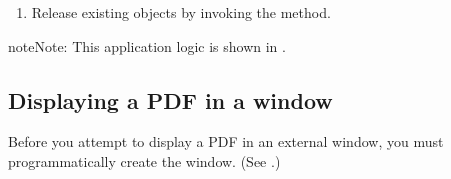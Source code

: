 \documentclass[letterpaper,12pt,english,openany,oneside]{sphinxmanual}
\begin{document}
\begin{sphinxVerbatim}[commandchars=\\\{\}]
    
       
\end{sphinxVerbatim}
\begin{enumerate}
%
\setcounter{enumi}{10}
\item {} 
Release existing  objects by invoking the  method.

\end{enumerate}

\begin{sphinxVerbatim}[commandchars=\\\{\}]
 
  
\end{sphinxVerbatim}

\begin{sphinxadmonition}{note}{Note:}
This application logic is shown in .
\end{sphinxadmonition}


\subsection{Displaying a PDF in a window}
\label{\detokenize{Plugins_Documents:displaying-a-pdf-in-a-window}}
Before you attempt to display a PDF in an external window, you must programmatic\sphinxhyphen{}ally create the window. (See .)
\end{document}
